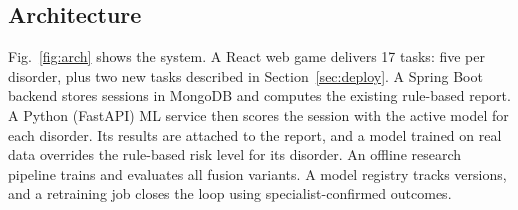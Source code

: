 \documentclass[conference]{IEEEtran}
\begin{document}
\subsection{Architecture}
Fig.~\ref{fig:arch} shows the system. A React web game delivers 17 tasks: five per disorder, plus two new tasks
described in Section~\ref{sec:deploy}. A Spring Boot backend stores sessions in MongoDB and computes the existing
rule-based report. A Python (FastAPI) ML service then scores the session with the active model for each disorder.
Its results are attached to the report, and a model trained on real data overrides the rule-based risk level for its
disorder. An offline research pipeline trains and evaluates all fusion variants. A model registry tracks versions,
and a retraining job closes the loop using specialist-confirmed outcomes.
\end{document}
